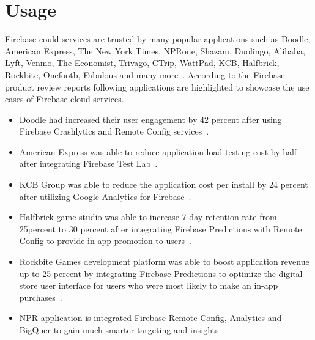 \section{Usage} Firebase could services are trusted by many popular applications
such as Doodle\cite{hid-sp18-409-www-doodle}, American
Express\cite{hid-sp18-409-www-americanexpress}, The New York
Times\cite{hid-sp18-409-www-nytimes}, NPRone\cite{hid-sp18-409-www-npr},
Shazam\cite{hid-sp18-409-www-shazam}, Duolingo\cite{hid-sp18-409-www-duolingo},
Alibaba\cite{hid-sp18-409-www-alibaba}, Lyft\cite{hid-sp18-409-www-lyft},
Venmo\cite{hid-sp18-409-www-venmo}, The
Economist\cite{hid-sp18-409-www-economist},
Trivago\cite{hid-sp18-409-www-trivago}, CTrip\cite{hid-sp18-409-www-ctrip},
WattPad\cite{hid-sp18-409-www-wattpad}, KCB\cite{hid-sp18-409-www-kcbgroup},
Halfbrick\cite{hid-sp18-409-www-halfbrick},
Rockbite\cite{hid-sp18-409-www-rockbitegames},
Onefootb\cite{hid-sp18-409-www-onefootball},
Fabulous\cite{hid-sp18-409-www-thefabulous} and many
more~\cite{hid-sp18-409-www-firebase, hid-sp18-409-www-firebase-usecases}.
According to the Firebase product review reports following applications are
highlighted to showcase the use cases of Firebase cloud services.

\begin{itemize} \item Doodle had increased their user engagement by 42 percent
	after using Firebase Crashlytics and Remote Config
	services~\cite{hid-sp18-409-www-doodle, hid-sp18-409-www-firebase-usecases}.
	
	\item American Express was able to reduce application load testing cost by 
	half
	after integrating Firebase Test Lab~\cite{hid-sp18-409-www-americanexpress}.
	
	\item KCB Group was able to reduce the application cost per install by 24
	percent after utilizing Google Analytics for
	Firebase~\cite{hid-sp18-409-www-kcbgroup, 
	hid-sp18-409-www-firebase-usecases}.
	
	\item Halfbrick game studio was able to increase 7-day retention rate from
	25percent to 30 percent after integrating Firebase Predictions with Remote
	Config to provide in-app promotion to 
	users~\cite{hid-sp18-409-www-halfbrick,
		hid-sp18-409-www-firebase-usecases}.
	
	\item Rockbite Games development platform was able to boost application 
	revenue
	up to 25 percent by integrating Firebase Predictions to optimize the digital
	store user interface for users who were most likely to make an in-app
	purchases~\cite{hid-sp18-409-www-rockbitegames}.
	
	\item NPR application is integrated Firebase Remote Config, Analytics and
	BigQuer to gain much smarter targeting and
	insights~\cite{hid-sp18-409-www-firebase-usecases}. \end{itemize}

